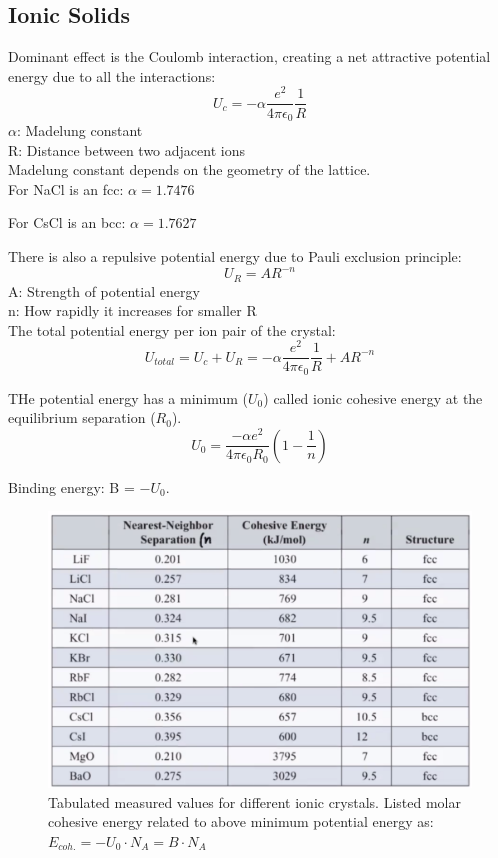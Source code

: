 \documentclass[class=article,crop=false]{standalone}
\begin{document}
\subsection{Ionic Solids}

Dominant effect is the Coulomb interaction, creating a net attractive potential energy due to all the interactions:
$$ U_c = - \alpha \frac{e^2}{4\pi\epsilon_0} \frac{1}{R} $$
$\alpha$: Madelung constant\\
R: Distance between two adjacent ions \\

Madelung constant depends on the geometry of the lattice. \\

For NaCl is an fcc:
$\alpha = 1.7476$

For CsCl is an bcc:
$\alpha = 1.7627$

There is also a repulsive potential energy due to Pauli exclusion principle:
$$ U_R = AR^{-n} $$
A: Strength of potential energy \\
n: How rapidly it increases for smaller R \\

The total potential energy per ion pair of the crystal:
$$ U_{total} = U_c + U_R = -\alpha \frac{e^2}{4 \pi \epsilon_0} \frac{1}{R} + AR^{-n} $$

THe potential energy has a minimum ($U_0$) called ionic cohesive energy at the equilibrium separation ($R_0$).
$$ U_0 = \frac{-\alpha e^2}{4\pi\epsilon_0 R_0} \left(1 - \frac{1}{n} \right) $$

Binding energy: B = $-U_0$.

\begin{figure}[h!]
	\centering
	\includegraphics[width=.8\linewidth]{./Images/tabulated.png}
	\caption{Tabulated measured values for different ionic crystals. Listed molar cohesive energy related to above minimum potential energy as: $E_{coh.} = -U_0 \cdot N_A = B \cdot N_A$}
\end{figure}
\end{document}
